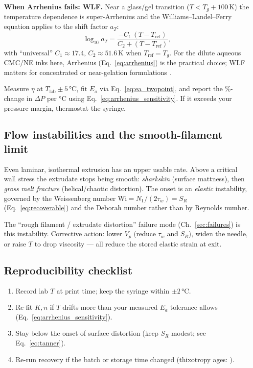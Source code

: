 \documentclass[11pt,a4paper]{article}
\begin{document}
\begin{goingdeeperbox}
\textbf{When Arrhenius fails: WLF.} Near a glass/gel transition
($T<T_g+100$\,K) the temperature dependence is super-Arrhenius and the
Williams--Landel--Ferry equation applies to the shift factor $a_T$:
\begin{equation}
\log_{10} a_T=\frac{-C_1\,(T-T_\mathrm{ref})}{C_2+(T-T_\mathrm{ref})},
\label{eq:wlf}
\end{equation}
with ``universal'' $C_1\approx17.4$, $C_2\approx51.6$\,K when
$T_\mathrm{ref}=T_g$. For the dilute aqueous CMC/NE inks here, Arrhenius
(Eq.~\ref{eq:arrhenius}) is the practical choice; WLF matters for
concentrated or near-gelation formulations \citep{WLF1955}.
\end{goingdeeperbox}

\begin{inpracticebox}
Measure $\eta$ at $T_\mathrm{lab}\pm5\,\si{\celsius}$, fit $E_a$ via
Eq.~\ref{eq:ea_twopoint}, and report the \%-change in $\Delta P$ per
\si{\celsius} using Eq.~\ref{eq:arrhenius_sensitivity}. If it exceeds
your pressure margin, thermostat the syringe.
\end{inpracticebox}

\subsection{Flow instabilities and the smooth-filament limit}
Even laminar, isothermal extrusion has an upper usable rate. Above a
critical wall stress the extrudate stops being smooth: \emph{sharkskin}
(surface mattness), then \emph{gross melt fracture} (helical/chaotic
distortion). The onset is an \emph{elastic} instability, governed by the
Weissenberg number $\mathrm{Wi}=N_1/(2\tau_w)=S_R$
(Eq.~\ref{eq:recoverable}) and the Deborah number rather than by Reynolds
number.

\begin{inpracticebox}
The ``rough filament / extrudate distortion'' failure mode
(Ch.~\ref{sec:failures}) is this instability. Corrective action: lower
$V_p$ (reduce $\tau_w$ and $S_R$), widen the needle, or raise $T$ to drop
viscosity --- all reduce the stored elastic strain at exit.
\end{inpracticebox}

\subsection{Reproducibility checklist}
\begin{enumerate}[leftmargin=1.6em,itemsep=2pt]
\item Record lab $T$ at print time; keep the syringe within
  $\pm2\,\si{\celsius}$.
\item Re-fit $K,n$ if $T$ drifts more than your measured $E_a$ tolerance
  allows (Eq.~\ref{eq:arrhenius_sensitivity}).
\item Stay below the onset of surface distortion (keep $S_R$ modest;
  see Eq.~\ref{eq:tanner}).
\item Re-run recovery if the batch or storage time changed (thixotropy
  ages: \citealp{Barnes1997,Mewis2009}).
\end{enumerate}
\end{document}
